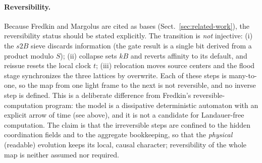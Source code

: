 \documentclass[a4paper]{article}
\begin{document}
\paragraph{Reversibility.} Because Fredkin and Margolus are cited as bases (Sect.~\ref{sec:related-work}), the reversibility status should be stated explicitly.  The transition is \emph{not} injective: (i) the $s2B$ sieve discards information (the gate result is a single bit derived from a product modulo $S$); (ii) collapse sets $kB$ and reverts affinity to its default, and reissue resets the local clock $t$; (iii) relocation moves source centers and the flood stage synchronizes the three lattices by overwrite.  Each of these steps is many-to-one, so the map from one light frame to the next is not reversible, and no inverse step is defined.  This is a deliberate difference from Fredkin's reversible-computation program: the model is a dissipative deterministic automaton with an explicit arrow of time (see above), and it is not a candidate for Landauer-free computation.  The claim is that the irreversible steps are confined to the hidden coordination fields and to the aggregate bookkeeping, so that the \emph{physical} (readable) evolution keeps its local, causal character; reversibility of the whole map is neither assumed nor required.
\end{document}
